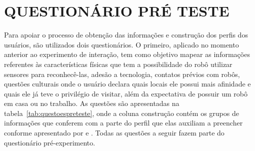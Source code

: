 \section{QUESTIONÁRIO PRÉ TESTE}
\label{sec:questionariopreteste}
Para apoiar o processo de obtenção das informações e construção dos perfis dos usuários, são utilizados dois questionários. O primeiro, aplicado no momento anterior ao experimento de interação, tem como objetivo mapear as informações referentes às características físicas que tem a possibilidade do robô utilizar sensores para reconhecê-las, adesão a tecnologia, contatos prévios com robôs, questões culturais onde o usuário declara quais locais ele possui mais afinidade e quais ele já teve o privilégio de visitar, além da expectativa de possuir um robô em casa ou no trabalho. As questões são apresentadas na tabela~\ref{tab:questoespreteste}, onde a coluna construção contém os grupos de informações que conferem com a parte do perfil que elas auxiliam a preencher conforme apresentado por \textcite{barbosa:2010} e \textcite{baxter:2015}. Todas as questões a seguir fazem parte do questionário pré-experimento.

